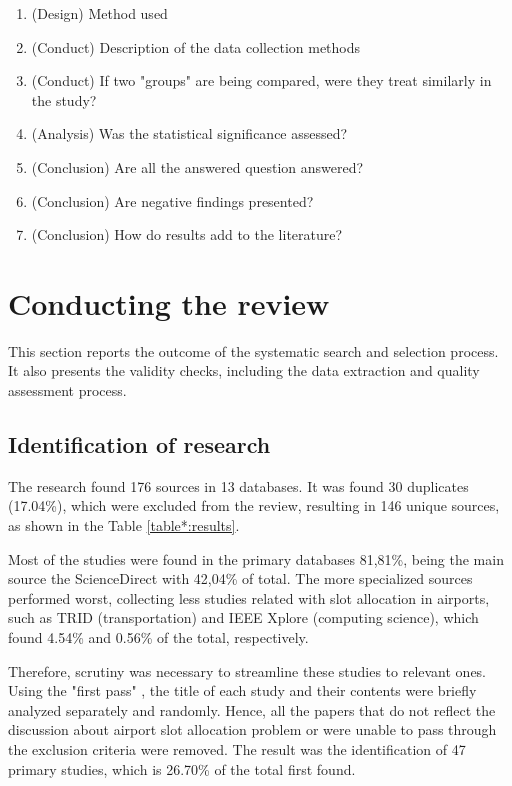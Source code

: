 \begin{enumerate}
    \item (Design) Method used
    \item(Conduct) Description of the data collection methods
    \item(Conduct) If two "groups" are being compared, were they treat similarly in the study?
    \item(Analysis) Was the statistical significance assessed?
    \item(Conclusion) Are all the answered question answered?
    \item(Conclusion) Are negative findings presented?
    \item(Conclusion) How do results add to the literature?
\end{enumerate}


\section{Conducting the review}
\label{section:Conducting}
This section reports the outcome of the systematic search and selection process. It also presents the validity checks, including the data extraction and quality assessment process.

\subsection{Identification of research}

The research found 176 sources in 13 databases. It was found 30 duplicates (17.04\%), which were excluded from the review, resulting in 146 unique sources, as shown in the Table \ref{table*:results}.



Most of the studies were found in the primary databases 81,81\%, being the main source the ScienceDirect with 42,04\% of total. The more specialized sources performed worst, collecting less studies related with slot allocation in airports, such as \acrshort{TRID} (transportation) and IEEE Xplore (computing science), which found 4.54\% and 0.56\% of the total, respectively. 

Therefore, scrutiny was necessary to streamline these studies to relevant ones. Using the "first pass" \cite{wohlin2012experimentation}, the title of each study and their contents were briefly analyzed separately and randomly. Hence, all the papers that do not reflect the discussion about airport slot allocation problem or were unable to pass through the exclusion criteria were removed. The result was the identification of 47 primary studies, which is 26.70\% of the total first found.
\\


